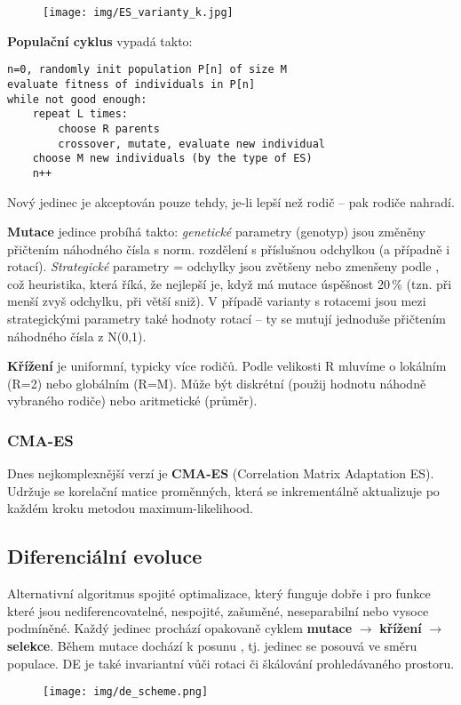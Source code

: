 \begin{figure}[h]
	\centering
\texttt{[image: img/ES\_varianty\_k.jpg]}
\end{figure}

\textbf{Populační cyklus} vypadá takto:
\medskip

\begin{minipage}{\linewidth}
	\begin{lstlisting}[frame=single]
n=0, randomly init population P[n] of size M
evaluate fitness of individuals in P[n]
while not good enough:
	repeat L times:
		choose R parents
		crossover, mutate, evaluate new individual
	choose M new individuals (by the type of ES)
	n++
	\end{lstlisting}
\end{minipage}

Nový jedinec je akceptován pouze tehdy, je-li lepší než rodič -- pak rodiče nahradí.

\textbf{Mutace} jedince probíhá takto: \textit{genetické} parametry (genotyp) jsou změněny přičtením náhodného čísla s norm. rozdělení s příslušnou odchylkou (a případně i rotací). \textit{Strategické} parametry = odchylky jsou zvětšeny nebo zmenšeny podle , což heuristika, která říká, že nejlepší je, když má mutace úspěšnost 20\,\% (tzn. při menší zvyš odchylku, při větší sniž). V případě varianty s rotacemi jsou mezi strategickými parametry také hodnoty rotací -- ty se mutují jednoduše přičtením náhodného čísla z N(0,1).

\textbf{Křížení} je uniformní, typicky více rodičů. Podle velikosti R mluvíme o lokálním (R=2) nebo globálním (R=M). Může být diskrétní (použij hodnotu náhodně vybraného rodiče) nebo aritmetické (průměr).

\subsubsection{CMA-ES}
Dnes nejkomplexnější verzí je \textbf{CMA-ES} (Correlation Matrix Adaptation ES). Udržuje se korelační matice proměnných, která se inkrementálně aktualizuje po každém kroku metodou maximum-likelihood.

\subsection{Diferenciální evoluce}
Alternativní algoritmus spojité optimalizace, který funguje dobře i pro funkce které jsou nediferencovatelné, nespojité, zašuměné, neseparabilní nebo vysoce podmíněné. Každý jedinec prochází opakovaně cyklem \textbf{mutace} $\rightarrow$ \textbf{křížení} $\rightarrow$ \textbf{selekce}. Během mutace dochází k posunu , tj. jedinec se posouvá ve směru populace. DE je také invariantní vůči rotaci či škálování prohledávaného prostoru.
\begin{figure}[H]
	\centering
	\texttt{[image: img/de\_scheme.png]}
\end{figure}

